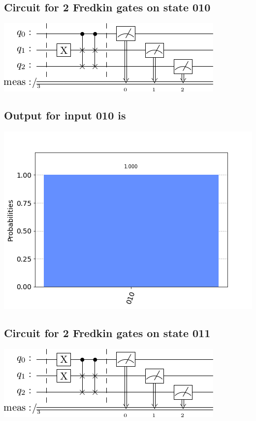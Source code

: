 \documentclass[a4paper]{article}
\begin{document}
\begin{answer}[Question 1 a]
        \subsection*{Circuit for 2 Fredkin gates on state 010}
        \includegraphics[scale = 0.5]{1a010.png}
        \subsection*{Output for input 010 is}
        \includegraphics[scale = 0.5]{1a010-out.png}
        \subsection*{Circuit for 2 Fredkin gates on state 011}
        \includegraphics[scale = 0.5]{1a011.png}

\end{answer}
\end{document}
